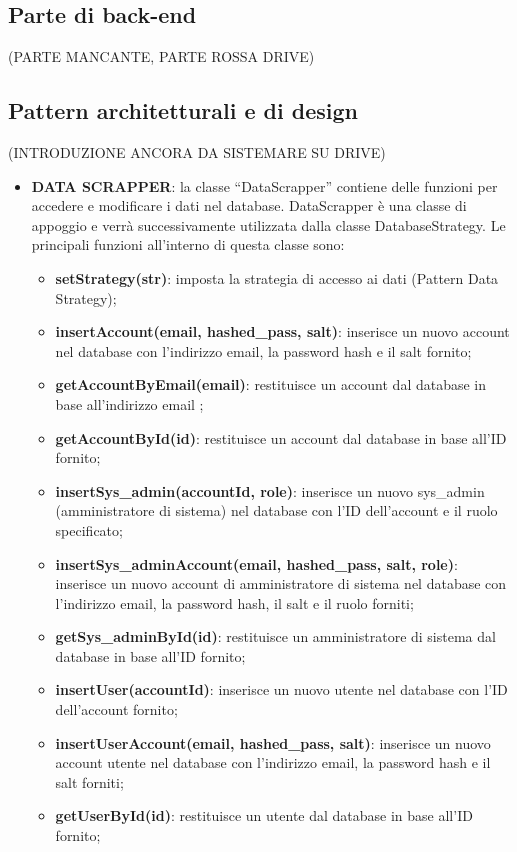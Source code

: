 \subsection{Parte di back-end}
(PARTE MANCANTE, PARTE ROSSA DRIVE)
\subsection{Pattern architetturali e di design}
(INTRODUZIONE ANCORA DA SISTEMARE SU DRIVE)
\begin{itemize}
    \item \textbf{DATA SCRAPPER}: la classe “DataScrapper” contiene delle funzioni per accedere e modificare i dati nel database. DataScrapper è una classe di appoggio e verrà successivamente utilizzata dalla classe DatabaseStrategy.
    Le principali funzioni all'interno di questa classe sono: \begin{itemize}
        \item \textbf{setStrategy(str)}: imposta la strategia di accesso ai dati (Pattern Data Strategy);
        \item \textbf{insertAccount(email, hashed\_pass, salt)}: inserisce un nuovo account nel database con l'indirizzo email, la password hash e il salt fornito;
        \item \textbf{getAccountByEmail(email)}: restituisce un account dal database in base all'indirizzo email ;
        \item \textbf{getAccountById(id)}: restituisce un account dal database in base all'ID fornito;
        \item \textbf{insertSys\_admin(accountId, role)}: inserisce un nuovo sys\_admin (amministratore di sistema) nel database con l'ID dell'account e il ruolo specificato;
        \item \textbf{insertSys\_adminAccount(email, hashed\_pass, salt, role)}: inserisce un nuovo account di amministratore di sistema nel database con l'indirizzo email, la password hash, il salt e il ruolo forniti;
        \item \textbf{getSys\_adminById(id)}: restituisce un amministratore di sistema dal database in base all'ID fornito;
        \item \textbf{insertUser(accountId)}: inserisce un nuovo utente nel database con l'ID dell'account fornito;
        \item \textbf{insertUserAccount(email, hashed\_pass, salt)}: inserisce un nuovo account utente nel database con l'indirizzo email, la password hash e il salt forniti;
        \item \textbf{getUserById(id)}: restituisce un utente dal database in base all'ID fornito;

\end{itemize}
\end{itemize}
